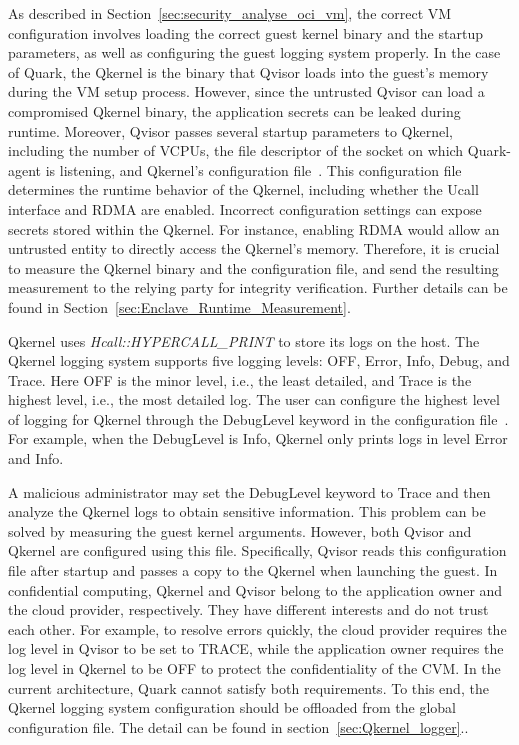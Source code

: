 As described in Section~\ref{sec:security_analyse_oci_vm}, the correct VM configuration involves loading the correct guest kernel binary and the startup parameters, as well as configuring the guest logging system properly. In the case of Quark, the Qkernel is the binary that Qvisor loads into the guest's memory during the VM setup process. However, 
since the untrusted Qvisor can load a compromised Qkernel binary, the application secrets can be leaked during runtime. Moreover, Qvisor passes several startup parameters to Qkernel, including the number of VCPUs, the file descriptor of the socket on which Quark-agent is listening, and Qkernel's configuration file~\cite*{quark_conf_file}. This configuration file 
determines the runtime behavior of the Qkernel, including whether the Ucall interface and RDMA are enabled. Incorrect configuration settings can expose secrets stored within the Qkernel. For instance, enabling RDMA would allow an untrusted entity to directly access the Qkernel's memory. Therefore, it is crucial to measure the Qkernel binary and the configuration 
file, and send the resulting measurement to the relying party for integrity verification. Further details can be found in Section~\ref{sec:Enclave_Runtime_Measurement}.

Qkernel uses \emph{Hcall::HYPERCALL\_PRINT} to store its logs on the host. The Qkernel logging system supports five logging levels: OFF, Error, Info, Debug, and Trace. Here OFF is the minor level, i.e., the least detailed, and Trace is the highest level, i.e., the most detailed log. The user can configure the highest level of logging for Qkernel through the 
DebugLevel keyword in the configuration file~\cite*{quark_conf_file}. For example, when the DebugLevel is Info, Qkernel only prints logs in level Error and Info.

A malicious administrator may set the DebugLevel keyword to Trace and then analyze the Qkernel logs to obtain sensitive information. This problem can be solved by measuring the guest kernel arguments. However, both Qvisor and Qkernel are configured using this file. Specifically, Qvisor reads this configuration file after startup and passes a copy to the 
Qkernel when launching the guest. In confidential computing, Qkernel and Qvisor belong to the application owner and the cloud provider, respectively. They have different interests and do not trust each other. For example, to resolve errors quickly, the cloud provider requires the log level in Qvisor to be set to TRACE, while the application owner requires the 
log level in Qkernel to be OFF to protect the confidentiality of the CVM. In the current architecture, Quark cannot satisfy both requirements. To this end, the Qkernel logging system configuration should be offloaded from the global configuration file. The detail can be found in section~\ref{sec:Qkernel_logger}..




